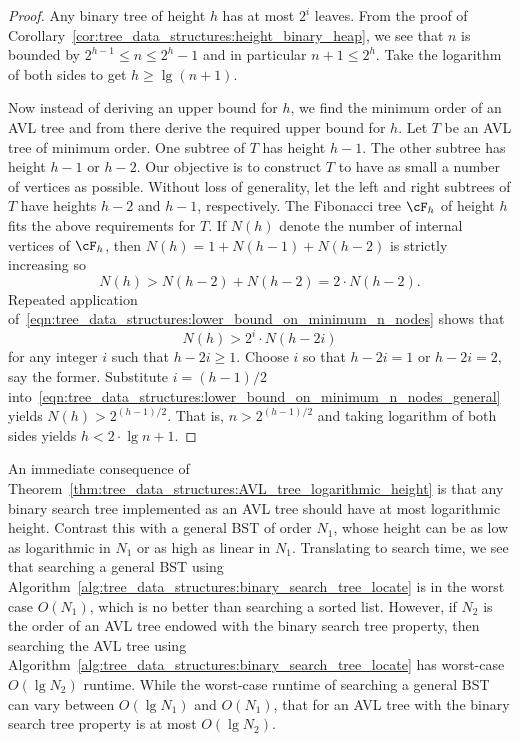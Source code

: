 \begin{proof}
Any binary tree of height $h$ has at most $2^i$ leaves. From the proof
of Corollary~\ref{cor:tree_data_structures:height_binary_heap}, we see
that $n$ is bounded by $2^{h - 1} \leq n \leq 2^h - 1$ and in
particular $n + 1 \leq 2^h$. Take the logarithm of both sides to get
$h \geq \lg(n + 1)$.

Now instead of deriving an upper bound for $h$, we find the minimum
order of an AVL tree and from there derive the required upper bound
for $h$. Let $T$ be an AVL tree of minimum order. One subtree of $T$
has height $h - 1$. The other subtree has height $h - 1$ or
$h - 2$. Our objective is to construct $T$ to have as small a number
of vertices as possible. Without loss of generality, let the left and
right subtrees of $T$ have heights $h - 2$ and $h - 1$,
respectively. The Fibonacci tree $\cF_h$ of height $h$ fits the above
requirements for $T$. If $N(h)$ denote the number of internal vertices
of $\cF_h$, then $N(h) = 1 + N(h - 1) + N(h - 2)$ is strictly
increasing so
\begin{equation}
\label{eqn:tree_data_structures:lower_bound_on_minimum_n_nodes}
N(h)
>
N(h - 2) + N(h - 2)
=
2 \cdot N(h - 2).
\end{equation}
Repeated application
of~\eqref{eqn:tree_data_structures:lower_bound_on_minimum_n_nodes}
shows that
\begin{equation}
\label{eqn:tree_data_structures:lower_bound_on_minimum_n_nodes_general}
N(h)
>
2^i \cdot N(h - 2i)
\end{equation}
for any integer $i$ such that $h - 2i \geq 1$. Choose $i$ so that
$h - 2i = 1$ or $h - 2i = 2$, say the former. Substitute
$i = (h - 1) / 2$
into~\eqref{eqn:tree_data_structures:lower_bound_on_minimum_n_nodes_general}
yields $N(h) > 2^{(h - 1) / 2}$. That is, $n > 2^{(h - 1) / 2}$ and
taking logarithm of both sides yields $h < 2 \cdot \lg n + 1$.
\end{proof}

An immediate consequence of
Theorem~\ref{thm:tree_data_structures:AVL_tree_logarithmic_height} is
that any binary search tree implemented as
an AVL tree should have at most logarithmic height. Contrast this with
a general BST of order $N_1$, whose height can be as low as
logarithmic in $N_1$ or as high as linear in $N_1$. Translating to
search time, we see that searching a general BST using
Algorithm~\ref{alg:tree_data_structures:binary_search_tree_locate} is
in the worst case $O(N_1)$, which is no better than searching a sorted
list. However, if $N_2$ is the order of an AVL tree endowed with the
binary search tree property, then
searching the AVL tree using
Algorithm~\ref{alg:tree_data_structures:binary_search_tree_locate} has
worst-case $O(\lg N_2)$ runtime. While the worst-case runtime of
searching a general BST can vary between $O(\lg N_1)$ and $O(N_1)$,
that for an AVL tree with the binary search tree property is at most
$O(\lg N_2)$.


